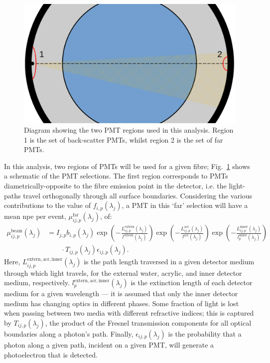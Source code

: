\begin{figure}
    \centering
    \includegraphics[width=\textwidth]{5_SMELLIEAnalysis/images/smellie_ext_length_pmt_selection_schematic.pdf}
    \caption[Diagram showing the two PMT regions used in the SMELLIE extinction length analysis]
    {Diagram showing the two PMT regions used in this analysis. Region 1 is the set of back-scatter PMTs, whilst region 2 is the set of far PMTs.}
    \label{fig:smellie_ext_length_schematic}
\end{figure}

In this analysis, two regions of PMTs will be used for a given fibre; Fig.~\ref{fig:smellie_ext_length_schematic} shows a schematic of the PMT selections. The first region corresponds to PMTs diametrically-opposite to the fibre emission point in the detector, i.e. the light-paths travel orthogonally through all surface boundaries.  Considering the various contributions to the value of $f_{i,p}(\lambda_{j})$, a PMT in this `far' selection will have a mean npe per event, $\mu_{ij,p}^{\mathrm{far}}(\lambda_{j})$, of:
\begin{align}\label{eq:smellie_ext_length_theory}
    \mu_{ij,p}^{\mathrm{beam}}(\lambda_{j}) &= I_{j,p}b_{i,p}(\lambda_{j})
    \exp\left(
        -\frac{L_{ij,p}^{\mathrm{extern}}(\lambda_{j})}{l^{\mathrm{extern}}(\lambda_{j})}
    \right)
    \exp\left(
        -\frac{L_{ij,p}^{\mathrm{acr}}(\lambda_{j})}{l^{\mathrm{acr}}(\lambda_{j})}
    \right)
    \exp\left(
        -\frac{L_{ij,p}^{\mathrm{inner}}(\lambda_{j})}{l_{p}^{\mathrm{inner}}(\lambda_{j})}
    \right)\nonumber\\
    & \qquad\cdot T_{ij,p}(\lambda_{j})\epsilon_{ij,p}(\lambda_{j}).
\end{align}
Here, $L_{ij,p}^{\mathrm{extern,acr,inner}}(\lambda_{j})$ is the path length traversed in a given detector medium through which light travels, for the external water, acrylic, and inner detector medium, respectively. $l_{p}^{\mathrm{extern,acr,inner}}(\lambda_{j})$ is the extinction length of each detector medium for a given wavelength --- it is assumed that only the inner detector medium has changing optics in different phases. Some fraction of light is lost when passing between two media with different refractive indices; this is captured by $T_{ij,p}(\lambda_{j})$, the product of the Fresnel transmission components for all optical boundaries along a photon's path. Finally, $\epsilon_{ij,p}(\lambda_{j})$ is the probability that a photon along a given path, incident on a given PMT, will generate a photoelectron that is detected. 

